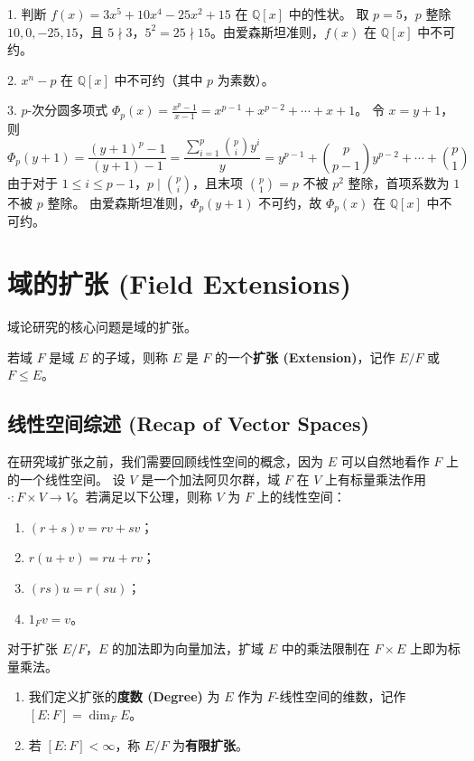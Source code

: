 \documentclass[11pt]{article}
\begin{document}
\begin{cnexample}
1. 判断 $f(x) = 3x^5 + 10x^4 - 25x^2 + 15$ 在 $\mathbb{Q}[x]$ 中的性状。
取 $p = 5$，$p$ 整除 $10, 0, -25, 15$，且 $5 \nmid 3$，$5^2 = 25 \nmid 15$。由爱森斯坦准则，$f(x)$ 在 $\mathbb{Q}[x]$ 中不可约。

2. $x^n - p$ 在 $\mathbb{Q}[x]$ 中不可约（其中 $p$ 为素数）。

3. $p$-次分圆多项式 $\Phi_p(x) = \frac{x^p - 1}{x - 1} = x^{p-1} + x^{p-2} + \cdots + x + 1$。
令 $x = y + 1$，则
$$ \Phi_p(y+1) = \frac{(y+1)^p - 1}{(y+1) - 1} = \frac{\sum_{i=1}^p \binom{p}{i} y^i}{y} = y^{p-1} + \binom{p}{p-1} y^{p-2} + \cdots + \binom{p}{1} $$
由于对于 $1 \le i \le p-1$，$p \mid \binom{p}{i}$，且末项 $\binom{p}{1} = p$ 不被 $p^2$ 整除，首项系数为 $1$ 不被 $p$ 整除。
由爱森斯坦准则，$\Phi_p(y+1)$ 不可约，故 $\Phi_p(x)$ 在 $\mathbb{Q}[x]$ 中不可约。
\end{cnexample}

\section{域的扩张 (Field Extensions)}

域论研究的核心问题是域的扩张。

\begin{cndefinition}[域的扩张]
若域 $F$ 是域 $E$ 的子域，则称 $E$ 是 $F$ 的一个\textbf{扩张 (Extension)}，记作 $E/F$ 或 $F \le E$。
\end{cndefinition}

\subsection{线性空间综述 (Recap of Vector Spaces)}

在研究域扩张之前，我们需要回顾线性空间的概念，因为 $E$ 可以自然地看作 $F$ 上的一个线性空间。
设 $V$ 是一个加法阿贝尔群，域 $F$ 在 $V$ 上有标量乘法作用 $\cdot : F \times V \to V$。若满足以下公理，则称 $V$ 为 $F$ 上的线性空间：
\begin{enumerate}
    \item $(r+s)v = rv + sv$；
    \item $r(u+v) = ru + rv$；
    \item $(rs)u = r(su)$；
    \item $1_F v = v$。
\end{enumerate}

对于扩张 $E/F$，$E$ 的加法即为向量加法，扩域 $E$ 中的乘法限制在 $F \times E$ 上即为标量乘法。
\begin{enumerate}
    \item 我们定义扩张的\textbf{度数 (Degree)} 为 $E$ 作为 $F$-线性空间的维数，记作 $[E:F] = \dim_F E$。
    \item 若 $[E:F] < \infty$，称 $E/F$ 为\textbf{有限扩张}。
\end{enumerate}
\end{document}
